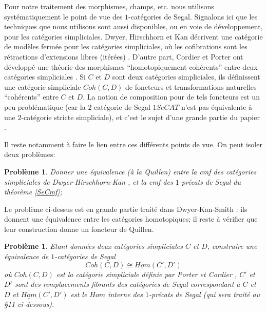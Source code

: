 \documentclass[12pt]{article}
\newtheorem{probleme}[lemma]{Probl\`eme}
\begin{document}
Pour notre traitement des morphismes, champs, etc. nous utilisons
syst\'ematiquement le point de vue des $1$-cat\'egories de Segal. Signalons
ici que
les techniques que nous utilisons
sont aussi disponibles, ou en voie de d\'eveloppement, pour les
cat\'egories simpliciales. Dwyer, Hirschhorn et Kan d\'ecrivent une
cat\'egorie de
mod\`eles ferm\'ee pour les cat\'egories simpliciales, o\`u les cofibrations
sont les r\'etractions d'extensions libres (it\'er\'ees) \cite{DHK}.
D'autre part, Cordier et Porter ont d\'evelopp\'e une th\'eorie des morphismes
``ho\-mo\-to\-pi\-que\-ment-coh\'erents'' entre deux cat\'egories simpliciales
\cite{CordierPorter}. Si $C$ et $D$ sont deux cat\'egories simpliciales, ils
d\'efinissent une cat\'egorie simpliciale $Coh(C,D)$ de foncteurs et
transformations naturelles ``coh\'erents'' entre $C$ et $D$. La notion de
composition pour de tels foncteurs est un peu probl\'ematique (car la
$2$-cat\'egorie de Segal $1SeCAT$ n'est pas \'equivalente \`a une
$2$-cat\'egorie stricte simpliciale), et c'est le sujet
d'une grande partie du papier \cite{CordierPorter}.

Il reste notamment \`a faire le lien entre ces diff\'erents
points de vue. On peut isoler deux probl\`emes:


\begin{probleme}
\label{probleme1}
Donner une \'equivalence (\`a la Quillen) entre la cmf des cat\'egories
simpliciales de Dwyer-Hirschhorn-Kan \cite{DHK}, et la cmf des $1$-pr\'ecats de
Segal du th\'eor\`eme \ref{SeCmf}; \end{probleme}

Le probl\`eme ci-dessus est en grande partie 
trait\'e dans Dwyer-Kan-Smith \cite{DKS}:
ils donnent une \'equivalence entre les cat\'egories homotopiques; il reste \`a
v\'erifier que leur construction donne un foncteur de Quillen. 

\begin{probleme}
\label{probleme2}
Etant donn\'ees deux cat\'egories
simpliciales $C$ et $D$, construire une \'e\-qui\-va\-len\-ce de
$1$-cat\'egories de Segal
$$
Coh (C,D) \cong \underline{Hom}(C',D')
$$
o\`u $Coh(C,D)$ est la cat\'egorie simpliciale d\'efinie par Porter et Cordier
\cite{CordierPorter},
$C'$ et $D'$ sont des remplacements fibrants des
cat\'egories de Segal correspondant \`a $C$ et $D$
et $\underline{Hom}(C',D')$ est le $Hom$ interne des $1$-pr\'ecats de Segal (qui
sera trait\'e au \S 11 ci-dessous).
\end{probleme}
\end{document}
